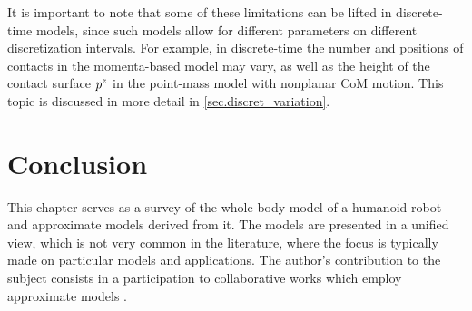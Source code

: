 It is important to note that some of these limitations can be lifted in
discrete-time models, since such models allow for different parameters on
different discretization intervals. For example, in discrete-time the number
and positions of contacts in the momenta-based model may vary, as well as the
height of the contact surface $p^z$ in the point-mass model with
nonplanar \ac{CoM} motion. This topic is discussed in more detail in
\cref{sec.discret_variation}.



\section{Conclusion}

This chapter serves as a survey of the whole body model of a humanoid robot and
approximate models derived from it. The models are presented in a unified view,
which is not very common in the literature, where the focus is typically made
on particular models and applications. The author's contribution to the subject
consists in a participation to collaborative works which employ approximate
models \cite{Agravante2016icra, Brasseur2015humanoids}.
